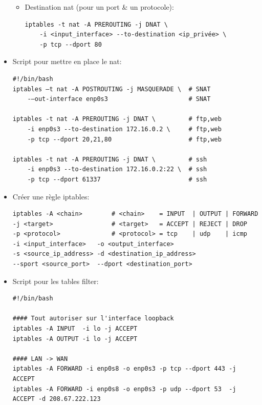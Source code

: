 \documentclass[a4paper]{article}
\begin{document}
\begin{itemize}
\begin{example}
\begin{itemize}
\item Destination nat (pour un port \& un protocole):
\begin{example} \begin{verbatim}
iptables -t nat -A PREROUTING -j DNAT \
    -i <input_interface> --to-destination <ip_privée> \
    -p tcp --dport 80
\end{verbatim} \end{example}

\end{itemize} \end{example}


\item Script pour mettre en place le nat:
\begin{example} \begin{verbatim}
#!/bin/bash
iptables –t nat -A POSTROUTING -j MASQUERADE \  # SNAT
    -–out-interface enp0s3                      # SNAT

iptables -t nat -A PREROUTING -j DNAT \         # ftp,web
    -i enp0s3 --to-destination 172.16.0.2 \     # ftp,web
    -p tcp --dport 20,21,80                     # ftp,web

iptables -t nat -A PREROUTING -j DNAT \         # ssh
    -i enp0s3 --to-destination 172.16.0.2:22 \  # ssh
    -p tcp --dport 61337                        # ssh
\end{verbatim} \end{example}


\item Créer une règle iptables:
\begin{example} \begin{verbatim}
iptables -A <chain>        # <chain>    = INPUT  | OUTPUT | FORWARD
-j <target>                # <target>   = ACCEPT | REJECT | DROP
-p <protocol>              # <protocol> = tcp    | udp    | icmp
-i <input_interface>   -o <output_interface>
-s <source_ip_address> -d <destination_ip_address>
--sport <source_port>  --dport <destination_port>
\end{verbatim} \end{example}


\item Script pour les tables filter:
\begin{example} \begin{verbatim}
#!/bin/bash

#### Tout autoriser sur l'interface loopback
iptables -A INPUT  -i lo -j ACCEPT
iptables -A OUTPUT -i lo -j ACCEPT

#### LAN -> WAN
iptables -A FORWARD -i enp0s8 -o enp0s3 -p tcp --dport 443 -j ACCEPT
iptables -A FORWARD -i enp0s8 -o enp0s3 -p udp --dport 53  -j ACCEPT -d 208.67.222.123


\end{verbatim}
\end{example}
\end{itemize}
\end{document}
